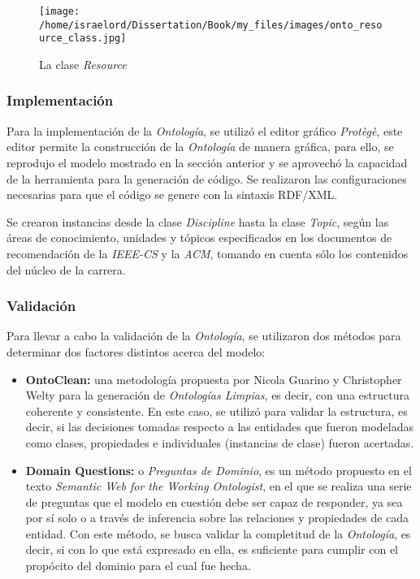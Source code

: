 \newpage
\begin{figure}[!h]
    \begin{center}
        \texttt{[image: /home/israelord/Dissertation/Book/my\_files/images/onto\_resource\_class.jpg]}
        \caption{La clase \textit{Resource}}
        \label{resourceClass}
    \end{center}
\end{figure}


\subsubsection{Implementación}
Para la implementación de la \textit{Ontología}, se utilizó el editor gráfico \textit{Protègè}, este editor permite la construcción de la \textit{Ontología} de manera gráfica, para ello, se reprodujo el modelo mostrado en la sección anterior y se aprovechó la capacidad de la herramienta para la generación de código. Se realizaron las configuraciones necesarias para que el código se genere con la sintaxis RDF/XML.

Se crearon instancias desde la clase \textit{Discipline} hasta la clase \textit{Topic}, según las áreas de conocimiento, unidades y tópicos especificados en los documentos de recomendación de la \textit{IEEE-CS} y la \textit{ACM}, tomando en cuenta sólo los contenidos del núcleo de la carrera.

\subsubsection{Validación}
Para llevar a cabo la validación de la \textit{Ontología}, se utilizaron dos métodos para determinar dos factores distintos acerca del modelo: 

\begin{itemize}
    \item \textbf{OntoClean:} una metodología propuesta por Nicola Guarino y Christopher Welty para la generación de \textit{Ontologías Limpias}, es decir, con una estructura coherente y consistente. En este caso, se utilizó para validar la estructura, es decir, si las decisiones tomadas respecto a las entidades que fueron modeladas como clases, propiedades e individuales (instancias de clase) fueron acertadas.
    \item \textbf{Domain Questions:} o \textit{Preguntas de Dominio}, es un método propuesto en el texto \textit{Semantic Web for the Working Ontologist}, en el que se realiza una serie de preguntas que el modelo en cuestión debe ser capaz de responder, ya sea por sí solo o a través de inferencia sobre las relaciones y propiedades de cada entidad. Con este método, se busca validar la completitud de la \textit{Ontología}, es decir, si con lo que está expresado en ella, es suficiente para cumplir con el propócito del dominio para el cual fue hecha.
\end{itemize}

\newpage
